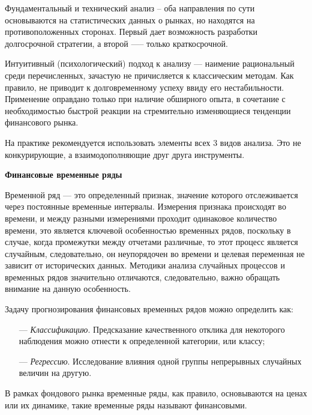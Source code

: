 \par Фундаментальный и технический анализ – оба направления по сути основываются на статистических данных о рынках, но находятся на противоположенных сторонах. Первый дает возможность
разработки долгосрочной стратегии, а второй —-- только краткосрочной.

\par Интуитивный (психологический) подход к анализу ---  наимение рациональный среди перечисленных, зачастую не причисляется к классическим методам. Как правило, не приводит к долговременному успеху ввиду его нестабильности. Применение оправдано только при наличие обширного опыта, в сочетание с необходимостью быстрой реакции на стремительно изменяющиеся тенденции финансового рынка.

\par На практике рекомендуется использовать элементы всех 3 видов
анализа. Это не конкурирующие, а взаимодополняющие друг друга
инструменты.

\textbf{Финансовые временные ряды}

\par Временной ряд --– это определенный признак, значение которого отслеживается через постоянные временные интервалы. Измерения признака происходят во времени, и между разными измерениями проходит одинаковое количество времени, это является ключевой особенностью временных рядов, поскольку в случае, когда промежутки между отчетами различные, то этот процесс является случайным, следовательно, он неупорядочен во времени и целевая переменная не зависит от исторических данных. Методики анализа случайных процессов и временных рядов значительно отличаются, следовательно, важно обращать внимание на данную особенность.\cite{dynamic}

\par Задачу прогнозирования финансовых временных рядов можно определить как:
\begin{itemize}[leftmargin=1.6\parindent]
    \item[---] \textit{Классификацию}. Предсказание качественного отклика для некоторого наблюдения можно отнести к определенной категории, или классу;
	\item[---] \textit{Регрессию}. Исследование влияния одной группы непрерывных случайных величин на другую.
\end{itemize}

\par В рамках фондового рынка временные ряды, как правило, основываются на ценах или
их динамике, такие временные ряды называют финансовыми.

